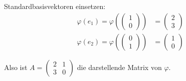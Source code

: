 Standardbasisvektoren einsetzen:
\begin{align*}
	\varphi(e_1) = \varphi\left(\begin{pmatrix}1\\0\end{pmatrix}\right) &= \begin{pmatrix}2\\3\end{pmatrix} \\
	\varphi(e_2) = \varphi\left(\begin{pmatrix}0\\1\end{pmatrix}\right) &= \begin{pmatrix}1\\0\end{pmatrix}
\end{align*}

Also ist $A = \begin{pmatrix}2 & 1 \\ 3 & 0\end{pmatrix}$ die darstellende Matrix von $\varphi$.
